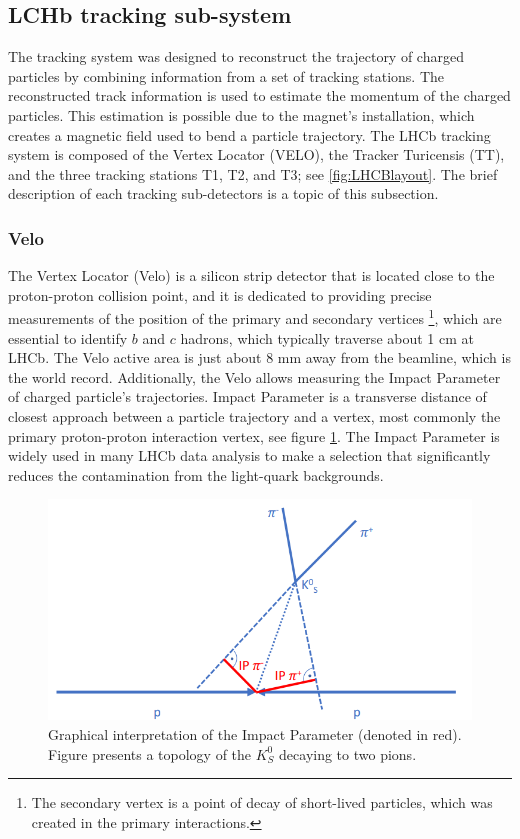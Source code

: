 \subsection{LCHb tracking sub-system}
\label{sec:lhcb_tracking_subsystem}
The tracking system was designed to reconstruct the trajectory of charged particles by combining information from a set of tracking stations. The reconstructed track information is used to estimate the momentum of the charged particles. This estimation is possible due to the magnet's installation, which creates a magnetic field used to bend a particle trajectory. The LHCb tracking system is composed of the Vertex Locator (VELO), the Tracker Turicensis (TT), and the three tracking stations T1, T2, and T3; see \ref{fig:LHCBlayout}.  The brief description of each tracking sub-detectors is a topic of this subsection. 

\subsubsection{Velo}
\label{sec:velo}
The Vertex Locator (Velo) \cite{VELO} is a silicon strip detector that is located close to the proton-proton collision point, and it is dedicated to providing precise measurements of the position of the primary and secondary vertices \footnote{The secondary vertex is a point of decay of short-lived particles, which was created in the primary interactions. }, which are essential to identify $b$ and $c$ hadrons, which typically traverse about 1 cm at LHCb.  
The Velo active area is just about 8 mm away from the beamline, which is the world record. Additionally, the Velo allows measuring the Impact Parameter of charged particle's trajectories. Impact Parameter is a transverse distance of closest approach between a particle trajectory and a vertex, most commonly the primary proton-proton interaction vertex, see figure \ref{fig:IP}. The Impact Parameter is widely used in many LHCb data analysis to make a selection that significantly reduces the contamination from the light-quark backgrounds.  


\begin{figure}[h]
\centering
\includegraphics{figures/IP.PNG}
\caption{Graphical interpretation of the Impact Parameter (denoted in red). Figure presents a topology of the $K_S^0$ decaying to two pions.  
\label{fig:IP}}
\end{figure}

